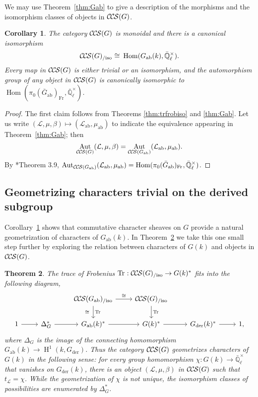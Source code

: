 \documentclass[10pt]{amsart}
\theoremstyle{plain}
\newtheorem{theorem}{Theorem}[section]
\newtheorem{corollary}[theorem]{Corollary}
\theoremstyle{definition}
\newcommand{\EE}{\mathbb{\bar Q}_\ell}
\newcommand{\Fq}{k}
\newcommand{\EEx}{\EE^\times}
\newcommand{\Frob}[1]{\operatorname{Fr}_{#1}}
\DeclareMathOperator{\Aut}{Aut}
\DeclareMathOperator{\Hom}{Hom}
\DeclareMathOperator{\Hh}{H}
\newcommand{\der}{_{\operatorname{der}}}
\newcommand{\ab}{_{\operatorname{ab}}}
\newcommand{\iso}{{\ \cong\ }}
\newcommand{\trFrob}[1]{t_{#1}}
\DeclareMathOperator{\Tr}{Tr}
\newcommand{\TrFrob}[1]{\Tr_{#1}}
\newcommand{\cs}[1]{{\mathcal{#1}}}
\newcommand{\CCS}{{\mathcal{C\hskip-.8pt C\hskip-0.8pt S}}}
\newcommand{\CCSiso}[1]{\CCS(#1)_{/\text{iso}}}
\begin{document}
We may use Theorem~\ref{thm:Gab} to give a description of the morphisms and the isomorphism classes of objects in $\CCS(G)$. 

\begin{corollary}\label{cor:Gab}
The category $\CCS(G)$ is monoidal and there is a canonical isomorphism
\[
\CCSiso{G} \iso \Hom(G\ab(\Fq),\EEx).
\]
Every map in $\CCS(G)$ is either trivial or an isomorphism, and the automorphism group of any object in $\CCS(G)$ is canonically
isomorphic to $\Hom(\pi_0(\bar{G}\ab)_{\Frob{}},\EEx)$.
\end{corollary}

\begin{proof}
The first claim follows from Theorems \ref{thm:trfrobiso} and \ref{thm:Gab}. Let us write $(\cs{L},\mu,\beta) \mapsto (\cs{L}\ab,\mu\ab)$ to indicate the equivalence appearing in Theorem~\ref{thm:Gab};
then \[\Aut_{\CCS(G)}(\cs{L},\mu,\beta) = \Aut_{\CCS(G\ab)}(\cs{L}\ab,\mu\ab).\] 
By \cite{cunningham-roe:13a}*{Theorem 3.9},  $\Aut_{\CCS(G\ab)}(\cs{L}\ab,\mu\ab) = \Hom(\pi_0(\bar{G}\ab)_{\Frob{}},\EEx)$.
\end{proof}

\subsection{Geometrizing characters trivial on the derived subgroup} \label{ssec:geo}

Corollary~\ref{cor:Gab} shows that commutative character sheaves on $G$ provide a natural geometrization of characters of $G\ab(k)$. In Theorem~\ref{thm:geo} we take this one small step further by exploring the relation between characters of $G(k)$ and objects in $\CCS(G)$. 

\begin{theorem}\label{thm:geo}
The trace of Frobenius $\TrFrob{} : \CCSiso{G}\to G(\Fq)^*$ fits into the following diagram,
\[
\begin{tikzcd}
\ & & \CCSiso{G\ab} \arrow{d}{\TrFrob{}}[swap]{\iso} \arrow{r}{\iso} & \CCSiso{G} \arrow{d}{\TrFrob{}}& \\
1 \arrow{r} & \Delta_G^* \arrow{r} & G\ab(k)^* \arrow{r} & G(k)^* \arrow{r} & G\der(k)^* \arrow{r} & 1,
\end{tikzcd}
\]
where $\Delta_G$ is the image of the connecting homomorphism $G\ab(\Fq) \to \Hh^1(\Fq, G\der)$. 
Thus the category $\CCS(G)$ geometrizes characters of $G(\Fq)$ in the following sense: for every group homomorphism $\chi : G(\Fq) \to \EEx$ that vanishes on $G\der(\Fq)$, there is an object $(\cs{L},\mu,\beta)$ in $\CCS(G)$ such that $\trFrob{\cs{L}} = \chi$. 
While the geometrization of $\chi$ is not unique, the isomorphism classes of possibilities are enumerated by $\Delta_G^*$.
\end{theorem}
\end{document}
